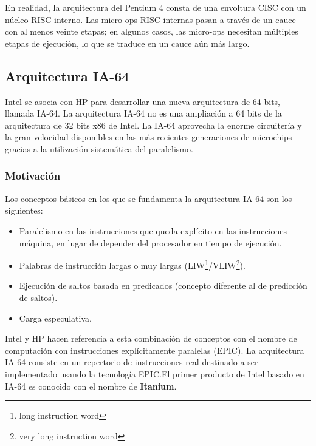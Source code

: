 En realidad, la arquitectura del Pentium 4 consta de una envoltura CISC con un núcleo RISC interno. Las micro-ops RISC internas pasan a través de un cauce con al menos veinte etapas; en algunos casos, las micro-ops necesitan múltiples etapas de ejecución, lo que se traduce en un cauce aún más largo.

\subsection{Arquitectura IA-64}

Intel se asocia con HP para desarrollar una nueva arquitectura de 64 bits, llamada IA-64. La arquitectura IA-64 no es una ampliación a 64 bits de la arquitectura de 32 bits x86 de Intel. La IA-64 aprovecha la enorme circuitería y la gran velocidad disponibles en las más recientes generaciones de microchips gracias a la utilización sistemática del paralelismo.

\subsubsection{Motivación}

Los conceptos básicos en los que se fundamenta la arquitectura IA-64 son los siguientes:

\begin{itemize}
  \item Paralelismo en las instrucciones que queda explícito en las instrucciones máquina, en lugar de depender del procesador en tiempo de ejecución.
  \item Palabras de instrucción largas o muy largas (LIW\footnote[1]{long instruction word}/VLIW\footnote[2]{very long instruction word}).
  \item Ejecución de saltos basada en predicados (concepto diferente al de predicción de saltos).
  \item Carga especulativa.
\end{itemize}

Intel y HP hacen referencia a esta combinación de conceptos con el nombre de computación con instrucciones explícitamente paralelas (EPIC). La arquitectura IA-64 consiste en un repertorio de instrucciones real destinado a ser implementado usando la tecnología EPIC.\@ El primer producto de Intel basado en IA-64 es conocido con el nombre de \textbf{Itanium}.

